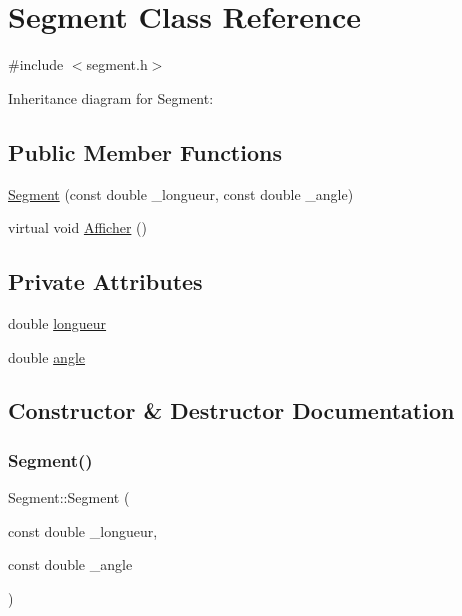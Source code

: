 \hypertarget{class_segment}{}\section{Segment Class Reference}
\label{class_segment}


{\ttfamily \#include $<$segment.\+h$>$}



Inheritance diagram for Segment\+:
\subsection*{Public Member Functions}
\begin{DoxyCompactItemize}
\item 
\hyperlink{class_segment_ad3b498d0e23a006fc3e750bd76153a2a}{Segment} (const double \+\_\+longueur, const double \+\_\+angle)
\item 
virtual void \hyperlink{class_segment_a79c645f8ecf90ffa5818aa211e0f29d2}{Afficher} ()
\end{DoxyCompactItemize}
\subsection*{Private Attributes}
\begin{DoxyCompactItemize}
\item 
double \hyperlink{class_segment_a89584eea5e0b7c9d3fe5bcddf437f358}{longueur}
\item 
double \hyperlink{class_segment_a58f4b5a7f3c0a1038d10e778f3684b20}{angle}
\end{DoxyCompactItemize}


\subsection{Constructor \& Destructor Documentation}
\mbox{\label{class_segment_ad3b498d0e23a006fc3e750bd76153a2a}} 
\subsubsection{\texorpdfstring{Segment()}{Segment()}}
{\footnotesize\ttfamily Segment\+::\+Segment (\begin{DoxyParamCaption}\item[{const double}]{\+\_\+longueur,  }\item[{const double}]{\+\_\+angle }\end{DoxyParamCaption})}



